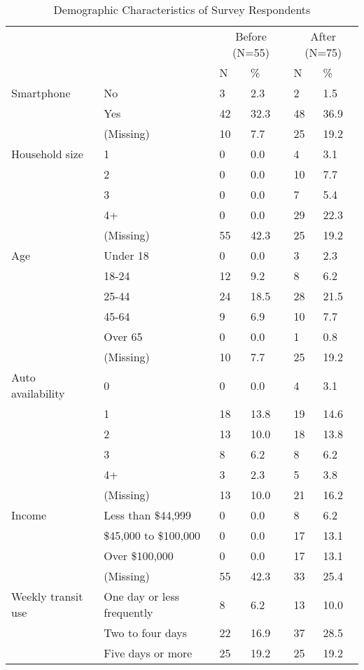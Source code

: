 \documentclass[smartcities,article,submit,moreauthors,pdftex]{Definitions/mdpi}
\begin{document}
\begin{table}[ht]
    \centering
    \caption{Demographic Characteristics of Survey Respondents}
    \label{tab:survey-respondents}
 \renewcommand{\arraystretch}{1.5}
\begin{tabular}[t]{llllll}
\toprule
\multicolumn{2}{c}{ } & \multicolumn{2}{c}{Before (N=55)} & \multicolumn{2}{c}{After (N=75)} \\
\cmidrule(l{3pt}r{3pt}){3-4} \cmidrule(l{3pt}r{3pt}){5-6}
  &    & N & \% & N  & \% \\
\midrule
Smartphone & No & 3 & 2.3 & 2 & 1.5\\
 & Yes & 42 & 32.3 & 48 & 36.9\\
 & (Missing) & 10 & 7.7 & 25 & 19.2\\
Household size & 1 & 0 & 0.0 & 4 & 3.1\\
 & 2 & 0 & 0.0 & 10 & 7.7\\
 & 3 & 0 & 0.0 & 7 & 5.4\\
 & 4+ & 0 & 0.0 & 29 & 22.3\\
 & (Missing) & 55 & 42.3 & 25 & 19.2\\
Age & Under 18 & 0 & 0.0 & 3 & 2.3\\
 & 18-24 & 12 & 9.2 & 8 & 6.2\\
 & 25-44 & 24 & 18.5 & 28 & 21.5\\
 & 45-64 & 9 & 6.9 & 10 & 7.7\\
 & Over 65 & 0 & 0.0 & 1 & 0.8\\
 & (Missing) & 10 & 7.7 & 25 & 19.2\\
Auto availability & 0 & 0 & 0.0 & 4 & 3.1\\
 & 1 & 18 & 13.8 & 19 & 14.6\\
 & 2 & 13 & 10.0 & 18 & 13.8\\
 & 3 & 8 & 6.2 & 8 & 6.2\\
 & 4+ & 3 & 2.3 & 5 & 3.8\\
 & (Missing) & 13 & 10.0 & 21 & 16.2\\
Income & Less than \$44,999 & 0 & 0.0 & 8 & 6.2\\
 & \$45,000 to \$100,000 & 0 & 0.0 & 17 & 13.1\\
 & Over \$100,000 & 0 & 0.0 & 17 & 13.1\\
 & (Missing) & 55 & 42.3 & 33 & 25.4\\
Weekly transit use & One day or less frequently & 8 & 6.2 & 13 & 10.0\\
 & Two to four days & 22 & 16.9 & 37 & 28.5\\
 & Five days or more & 25 & 19.2 & 25 & 19.2\\
\bottomrule
\end{tabular}
\end{table}
\end{document}
